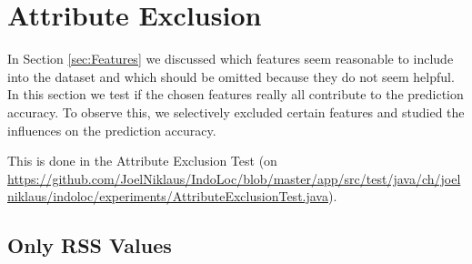 %
%



\section{Attribute Exclusion}
\label{sec:AttributeExclusion}

In Section \ref{sec:Features} we discussed which features seem reasonable to include into the dataset and which should be omitted because they do not seem helpful. In this section we test if the chosen features really all contribute to the prediction accuracy. To observe this, we selectively excluded certain features and studied the influences on the prediction accuracy.

This is done in the Attribute Exclusion Test (on  \url{https://github.com/JoelNiklaus/IndoLoc/blob/master/app/src/test/java/ch/joelniklaus/indoloc/experiments/AttributeExclusionTest.java}).

\subsection{Only RSS Values}

